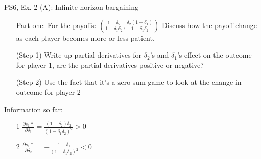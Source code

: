 \begin{frame}{PS6, Ex. 2 (A): Infinite-horizon bargaining}
    \begin{itemize}
    \item[Part one:] For the payoffs: $ \left( \frac{1-\delta_2}{1-\delta_1\delta_2},\frac{\delta_2(1-\delta_1)}{1-\delta_1\delta_2}\right)$ Discuss how the payoff change as each player becomes more or less patient.
    \end{itemize}
    \vfill\null
  \begin{multicols}{2}
    \begin{itemize}
      \item[(Step 1)] Write up partial derivatives for $\delta_2$'s and $\delta_1$'s effect on the outcome for player 1, are the partial derivatives positive or negative?
      \item[(Step 2)] Use the fact that it's a zero sum game to look at the change in outcome for player 2
      \end{itemize}
    \vfill\null \columnbreak
    Information so far:
    \begin{itemize}
    \item[1] $\frac{\partial s_1*}{\partial \delta_1} = \frac{(1-\delta_2)\delta_2}{(1-\delta_1\delta_2)^2}>0 $\\
    \item[2] $\frac{\partial s_1*}{\partial \delta_2} = -\frac{1-\delta_1}{(1-\delta_1\delta_2)^2}<0 $\\
    \end{itemize}
    \vfill\null
  \end{multicols}
 \vfill\null
\end{frame}

